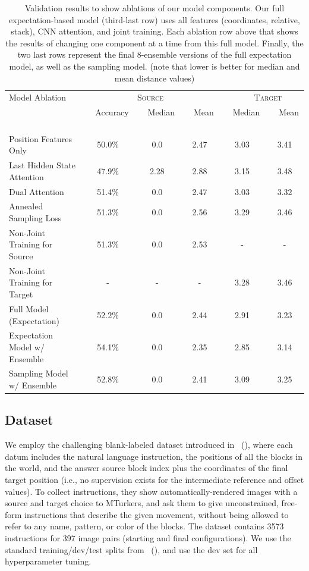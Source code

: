 \documentclass[letterpaper]{article} %
\newcommand{\newcite}[1]{\citeauthor{#1} (\citeyear{#1})}
\begin{document}
\begin{table}[ht!]
\begin{center}
\begin{tabular}{|l|ccc|cc|}
\hline
\multirow{1}{*}{Model Ablation } & \multicolumn{3}{c|}{\textsc{Source}} & \multicolumn{2}{c|}{\textsc{ \ \ \ Target}} \\
&  \ \ Accuracy \ \  & \ \  Median \ \  &  \ \ Mean  \ \  & \ \  Median \ \  &  \ \ Mean \ \  \\
\hline
Position Features Only				&	50.0\%			&	0.0		&	2.47	&	3.03	&	3.41	\\
\hline
Last Hidden State Attention	& 	47.9\%	&	2.28	&	2.88	&	3.15	&	3.48	\\
Dual Attention 	& 	51.4\%	&	0.0		&	2.47	&	3.03	&	3.32	\\
\hline
Annealed Sampling Loss			&	51.3\%		&	0.0	&	2.56	&	3.29	&	3.46	\\
\hline
Non-Joint Training for Source \ \ \ \ \ \ 	&	51.3\%		&	0.0			&	2.53	&	-	&	-	\\
Non-Joint Training for Target	&	-		&	-			& -	&	3.28	&	3.46	\\
\hline
Full Model (Expectation)	&	52.2\%	&	0.0		&	2.44	&	2.91	&	3.23	\\
\hline
\hline
Expectation Model w/ Ensemble	&	54.1\%	&	0.0		&	2.35	&	2.85	&	3.14	\\
Sampling Model w/ Ensemble	&	52.8\%	&	0.0		&	2.41	&	3.09	&	3.25	\\
\hline
\end{tabular}
\end{center}
\caption{Validation results to show ablations of our model components. Our full expectation-based model (third-last row) uses all features (coordinates, relative, stack), CNN attention, and joint training. Each ablation row above that shows the results of changing one component at a time from this full model. Finally, the two last rows represent the final 8-ensemble versions of the full expectation model, as well as the sampling model. (note that lower is better for median and mean distance values)}
\label{table:valid}
\end{table}



\subsection{Dataset}
We employ the challenging blank-labeled dataset introduced in~\newcite{bisk2016natural}, where each datum includes the natural language instruction, the positions of all the blocks in the world, and the answer source block index plus the coordinates of the final target position (i.e., no supervision exists for the intermediate reference and offset values).
To collect instructions, they show automatically-rendered images with a source and target choice to MTurkers, and ask them to give unconstrained, free-form instructions that describe the given movement, without being allowed to refer to any name, pattern, or color of the blocks.
The dataset contains 3573 instructions for 397 image pairs (starting and final configurations).
We use the standard training/dev/test splits from~\newcite{bisk2016natural}, and use the dev set for all hyperparameter tuning.
\end{document}
